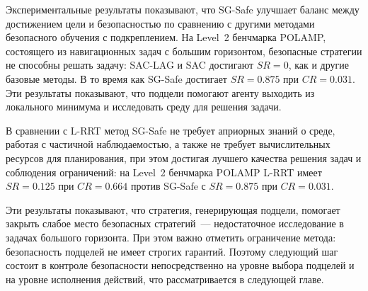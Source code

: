 Экспериментальные результаты показывают, что SG-Safe улучшает баланс между достижением цели и безопасностью по сравнению с другими методами безопасного обучения с подкреплением. На Level~2 бенчмарка POLAMP, состоящего из навигационных задач с большим горизонтом, безопасные стратегии не способны решать задачу: SAC-LAG и SAC достигают $SR=0$, как и другие базовые методы. В то время как SG-Safe достигает $SR=0.875$ при $CR=0.031$. Эти результаты показывают, что подцели помогают агенту выходить из локального минимума и исследовать среду для решения задачи.

В сравнении с L-RRT метод SG-Safe не требует априорных знаний о среде, работая с частичной наблюдаемостью, а также не требует вычислительных ресурсов для планирования, при этом достигая лучшего качества решения задач и соблюдения ограничений: на Level~2 бенчмарка POLAMP L-RRT имеет $SR=0.125$ при $CR=0.664$ против SG-Safe с $SR=0.875$ при $CR=0.031$.

Эти результаты показывают, что стратегия, генерирующая подцели, помогает закрыть слабое место безопасных стратегий~--- недостаточное исследование в задачах большого горизонта. При этом важно отметить ограничение метода: безопасность подцелей не имеет строгих гарантий. Поэтому следующий шаг состоит в контроле безопасности непосредственно на уровне выбора подцелей и на уровне исполнения действий, что рассматривается в следующей главе.
